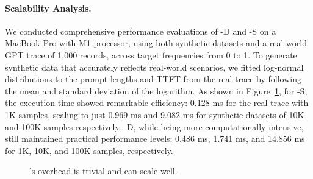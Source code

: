 \paragraph{Scalability Analysis.}
We conducted comprehensive performance evaluations of \disco{}-D and \disco{}-S on a MacBook Pro with M1 processor, using both synthetic datasets and a real-world GPT trace of 1,000 records, across target frequencies from 0 to 1. 
To generate synthetic data that accurately reflects real-world scenarios, we fitted log-normal distributions to the prompt lengths and TTFT from the real trace by following the mean and standard deviation of the logarithm. 
As shown in Figure~\ref{fig:overhead}, for \disco{}-S, the execution time showed remarkable efficiency: 0.128 ms for the real trace with 1K samples, scaling to just 0.969 ms and 9.082 ms for synthetic datasets of 10K and 100K samples respectively. \disco{}-D, while being more computationally intensive, still maintained practical performance levels: 0.486 ms, 1.741 ms, and 14.856 ms for 1K, 10K, and 100K samples, respectively.

\begin{figure}
    \hfill
    \caption{\disco{}'s overhead is trivial and can scale well.}
    \vskip -0.1in
    \label{fig:overhead}
\end{figure}
